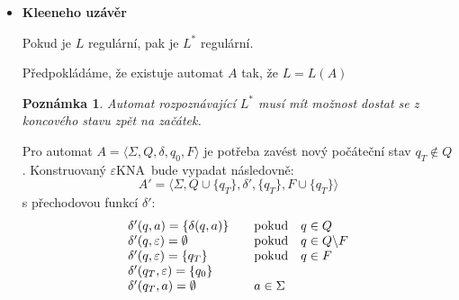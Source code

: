 \documentclass[10pt, a4paper, titlepage]{article}
\theoremstyle{note}
\newtheorem{poznamka}{\textbf{Poznámka}}
\newcommand{\ekna}{$\varepsilon$KNA} %
\begin{document}
\begin{itemize}
\begin{center}
\begin{VCPicture}{(-5,-2)(5,2)}
\end{VCPicture}
\end{center}

Sestavíme \ekna
$$A= \langle \Sigma,Q_1  \cup Q_2,\delta,\lbrace q_{01} \rbrace,F_2 \rangle$$
s přechodovou funkcí $\delta : (Q_1 \cup Q_2) \times (\Sigma \cup \lbrace \varepsilon \rbrace ) \rightarrow 2^{Q_1 \times Q_2}$
$$
\delta(q,a)=\left\{
\begin{array}{l@{\quad\mbox{}\quad}l}
\lbrace \delta_1(q,a) \rbrace & \text{pokud}\quad q \in Q_1\\
\lbrace \delta_2(q,a) \rbrace & \text{pokud}\quad q \in Q_2\\
\end{array}
\right.
$$
$$
\delta(q,\varepsilon)=\left\{
\begin{array}{l@{\quad\mbox{}\quad}l}
\lbrace q_{02} \rbrace & \text{pokud}\quad q \in F_1\\
\emptyset & \text{pokud}\quad q \notin F_1\\
\end{array}
\right.
$$

\item
\textbf{Kleeneho uzávěr}

Pokud je $L$ regulární, pak je $L^*$ regulární.

Předpokládáme, že existuje automat $A$ tak, že $L = L(A)$
\begin{poznamka}
Automat rozpoznávající $L^*$ musí mít možnost dostat se z koncového stavu zpět na začátek.
\end{poznamka}
Pro automat $A = \langle \Sigma, Q, \delta, q_0, F \rangle$ je potřeba zavést nový počáteční stav $q_T \notin Q$. Konstruovaný \ekna\ bude vypadat následovně:
$$A' = \langle \Sigma, Q \cup \lbrace q_T \rbrace, \delta ', \lbrace q_T \rbrace, F \cup \lbrace q_T \rbrace \rangle$$
s přechodovou funkcí $\delta '$:
$$
\begin{array}{l@{\quad\mbox{}\quad}l}
\delta ' (q,a) = \lbrace \delta (q,a) \rbrace & \text{pokud}\quad q \in Q\\
\delta ' (q,\varepsilon) = \emptyset & \text{pokud}\quad q \in Q \backslash F\\
\delta ' (q,\varepsilon) = \lbrace q_T \rbrace & \text{pokud}\quad q \in F\\
\delta ' (q_T,\varepsilon) = \lbrace q_0 \rbrace & \\
\delta ' (q_T,a) = \emptyset & a \in \Sigma \\

\end{array}
$$
\end{itemize}
\end{document}
